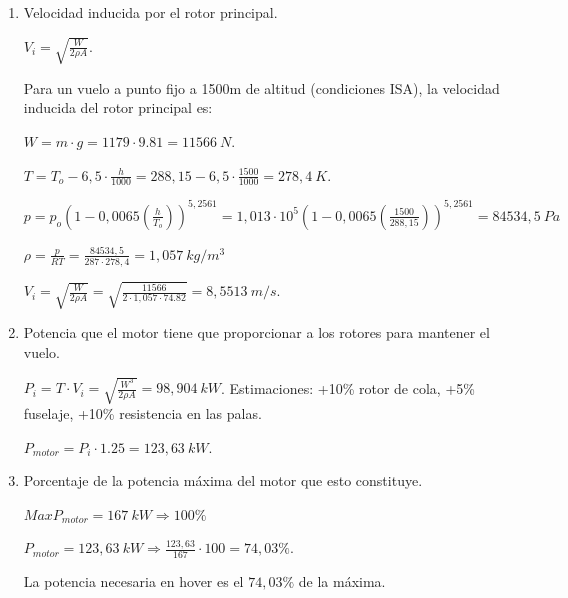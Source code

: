 \documentclass{article}
\begin{document}
    \begin{enumerate}
        \item Velocidad inducida por el rotor principal.
        
        \bigskip
        \begin{center}
            $V_{i} = \sqrt{\frac{W}{2 \rho A}}$.
        \end{center}

        Para un vuelo a punto fijo a 1500m de altitud (condiciones ISA), la velocidad inducida del rotor principal es:
        \begin{center}
            $W = m \cdot g = 1179 \cdot 9.81 = 11566\:N$.
            
            $T = T_{o} - 6,5 \cdot \frac{h}{1000} = 288,15 - 6,5 \cdot \frac{1500}{1000} = 278,4\:K$.

            $p = p_{o}(1 - 0,0065(\frac{h}{T_{o}}))^{5,2561} = 1,013 \cdot 10^5(1 - 0,0065(\frac{1500}{288,15}))^{5,2561} = 84534,5\:Pa$
            
            $\rho = \frac{p}{RT} = \frac{84534,5}{287 \cdot 278,4} = 1,057\:kg/m^3$
            
            $V_{i} = \sqrt{\frac{W}{2 \rho A}} = \sqrt{\frac{11566}{2 \cdot 1,057 \cdot 74.82}} = 8,5513\:m/s$.
        \end{center}
        
        \item Potencia que el motor tiene que proporcionar a los rotores para mantener el vuelo.
        
        \bigskip
        \begin{center}
            $P_{i} = T \cdot V_{i} = \sqrt{\frac{W^3}{2 \rho A}} = 98,904\:kW$.
            \newline
            \newline
            Estimaciones: +10\% rotor de cola, +5\% fuselaje, +10\% resistencia en las palas.
            
            $P_{motor} = P_{i} \cdot 1.25 = 123,63\:kW$.
        \end{center}

        \item Porcentaje de la potencia máxima del motor que esto constituye.
        \begin{center}
            $MaxP_{motor} = 167\:kW \Rightarrow 100\%$

            $P_{motor} = 123,63\:kW \Rightarrow \frac{123,63}{167}\cdot 100 = 74,03\%$.
        \end{center}
        La potencia necesaria en hover es el $74,03\%$ de la máxima.
    
    \end{enumerate}
\end{document}
